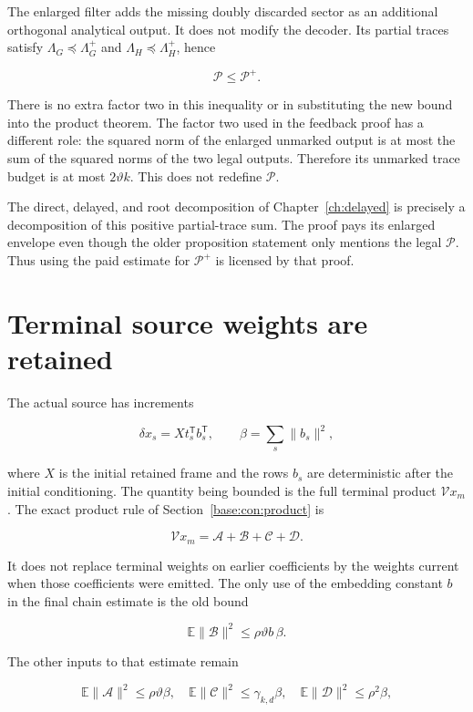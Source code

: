 \documentclass[11pt,oneside,openany,a4paper]{book}
\numberwithin{equation}{chapter}
\theoremstyle{definition}
\theoremstyle{remark}
\begin{document}
The enlarged filter adds the missing doubly discarded sector as an additional orthogonal analytical output. It does not modify the decoder. Its partial traces satisfy \(\Lambda_G\preceq\Lambda_G^+\) and \(\Lambda_H\preceq\Lambda_H^+\), hence

\[
\mathcal P\le\mathcal P^+.
\]

There is no extra factor two in this inequality or in substituting the new bound into the product theorem. The factor two used in the feedback proof has a different role: the squared norm of the enlarged unmarked output is at most the sum of the squared norms of the two legal outputs. Therefore its unmarked trace budget is at most \(2\vartheta k\). This does not redefine \(\mathcal P\).

The direct, delayed, and root decomposition of Chapter~\ref{ch:delayed} is precisely a decomposition of this positive partial-trace sum. The proof pays its enlarged envelope even though the older proposition statement only mentions the legal \(\mathcal P\). Thus using the paid estimate for \(\mathcal P^+\) is licensed by that proof.

\section{Terminal source weights are retained}\label{interfaces:terminal-source-weights-are-retained}

The actual source has increments

\[
\delta x_s=Xt_s^{\mathsf T}b_s^{\mathsf T},\qquad
\beta=\sum_s\|b_s\|^2,
\]

where \(X\) is the initial retained frame and the rows \(b_s\) are deterministic after the initial conditioning. The quantity being bounded is the full terminal product \(\mathcal Vx_m\). The exact product rule of Section~\ref{base:con:product} is

\[
\mathcal Vx_m=\mathcal A+\mathcal B+\mathcal C+\mathcal D.
\]

It does not replace terminal weights on earlier coefficients by the weights current when those coefficients were emitted. The only use of the embedding constant \(b\) in the final chain estimate is the old bound

\[
\mathbb E\|\mathcal B\|^2\le\rho\vartheta b\,\beta.
\]

The other inputs to that estimate remain

\[
\mathbb E\|\mathcal A\|^2\le\rho\vartheta\beta,\quad
\mathbb E\|\mathcal C\|^2\le\gamma_{k,d}\beta,\quad
\mathbb E\|\mathcal D\|^2\le\rho^2\beta,
\]
\end{document}
